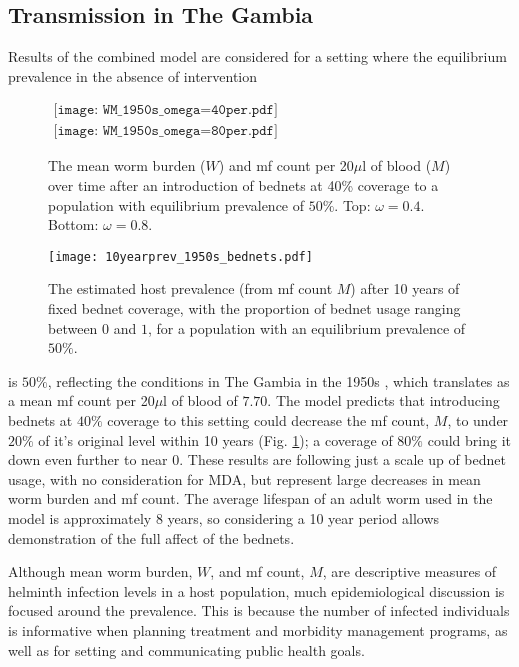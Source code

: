 \documentclass[5p,times]{elsarticle}
\begin{document}
\subsection{Transmission in The Gambia}

Results of the combined model are considered for a setting where the equilibrium prevalence in the absence of intervention \begin{figure}[h]
\begin{center}$
\begin{array}{c}
\texttt{[image: WM\_1950s\_omega=40per.pdf]}\\
\texttt{[image: WM\_1950s\_omega=80per.pdf]}
\end{array}$
\caption{The mean worm burden ($W$) and mf count per 20$\mu$l of blood ($M$) over time after an introduction of bednets at 40\% coverage to a population with equilibrium prevalence of $50\%$. Top: $\omega=0.4$. Bottom: $\omega=0.8$.}
\label{fig:WMs}
\end{center}
\end{figure} 
\begin{figure}[h]
\begin{center}
\texttt{[image: 10yearprev\_1950s\_bednets.pdf]}
\caption{The estimated host prevalence (from mf count $M$) after 10 years of fixed bednet coverage, with the proportion of bednet usage ranging between $0$ and $1$, for a population with an equilibrium prevalence of $50\%$.}
\label{fig:10year}
\end{center}
\end{figure} is $50\%$, reflecting the conditions in The Gambia in the 1950s \cite{rebollo2015}, which translates as a mean mf count per 20$\mu$l of blood of $7.70$. The model predicts that introducing bednets at $40\%$ coverage to this setting could decrease the mf count, $M$, to under $20\%$ of it's original level within 10 years (Fig. \ref{fig:WMs}); a coverage of $80\%$ could bring it down even further to near $0$. These results are following just a scale up of bednet usage, with no consideration for MDA, but represent large decreases in mean worm burden and mf count. The average lifespan of an adult worm used in the model is approximately 8 years, so considering a 10 year period allows demonstration of the full affect of the bednets. 

Although mean worm burden, $W$, and mf count, $M$, are descriptive measures of helminth infection levels in a host population, much epidemiological discussion is focused around the prevalence. This is because the number of infected individuals is informative when planning treatment and morbidity management programs, as well as for setting and communicating public health goals.
\end{document}
